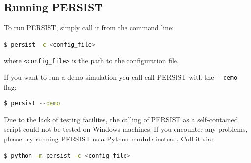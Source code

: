 \documentclass[
	a4paper, %
	12pt, %
]{persist}
\begin{document}
\subsection{Running PERSIST}

To run PERSIST, simply call it from the command line:

\begin{lstlisting}[language=bash]
	$ persist -c <config_file>
\end{lstlisting}

where \verb|<config_file>| is the path to the configuration file.

If you want to run a demo simulation you call call PERSIST with the \verb|--demo| flag:

\begin{lstlisting}[language=bash]
	$ persist --demo
\end{lstlisting}

\begin{note}
	Due to the lack of testing facilites, the calling of PERSIST as a self-contained script could not be tested on Windows machines. If you encounter any problems, please try running PERSIST as a Python module instead. Call it via:
	\begin{lstlisting}[language=bash]
	$ python -m persist -c <config_file>
	\end{lstlisting}
\end{note}


\newpage


\begin{twothirdswidth} %
	\printbibliography[title=Reference List] %
\end{twothirdswidth}


\newpage
\end{document}
